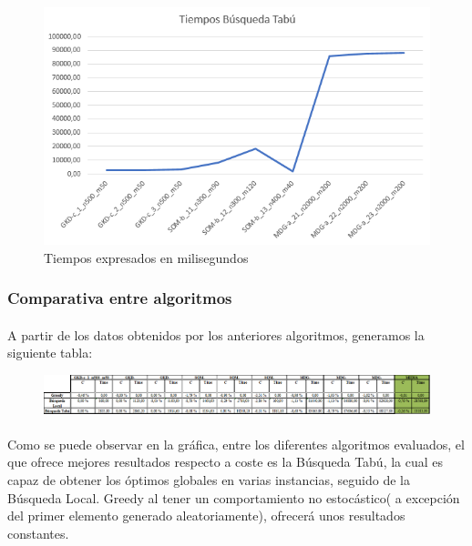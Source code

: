 \documentclass{article}
\begin{document}
			\begin{figure}[H]
				
				\centering
				\includegraphics[scale=0.4]{img/TiemposBtabu}
				\caption{Tiempos expresados en milisegundos}
				
			\end{figure}
	
		\subsubsection{Comparativa entre algoritmos}
		
		\paragraph{}A partir de los datos obtenidos por los anteriores algoritmos, generamos la siguiente tabla:
				
			\begin{figure}[H]
				
				\centering
				\includegraphics[scale=0.4]{img/Global}
				
			\end{figure}
		
		
		\paragraph{}Como se puede observar en la gráfica, entre los diferentes algoritmos evaluados, el que ofrece mejores resultados respecto a coste es la Búsqueda Tabú, la cual es capaz de obtener los óptimos globales en varias instancias, seguido de la Búsqueda Local. Greedy al tener un comportamiento no estocástico( a excepción del primer elemento generado aleatoriamente), ofrecerá unos resultados constantes.
			
\end{document}
